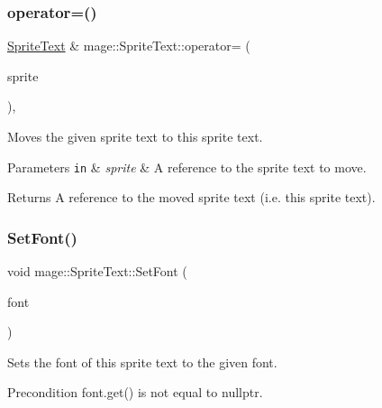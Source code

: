 \subsubsection{\texorpdfstring{operator=()}{operator=()}\hspace{0.1cm}{\footnotesize\ttfamily [2/2]}}
{\footnotesize\ttfamily \hyperlink{classmage_1_1_sprite_text}{Sprite\+Text} \& mage\+::\+Sprite\+Text\+::operator= (\begin{DoxyParamCaption}\item[{\hyperlink{classmage_1_1_sprite_text}{Sprite\+Text} \&\&}]{sprite }\end{DoxyParamCaption})\hspace{0.3cm}{\ttfamily [default]}, {\ttfamily [noexcept]}}

Moves the given sprite text to this sprite text.


\begin{DoxyParams}[1]{Parameters}
\mbox{\tt in}  & {\em sprite} & A reference to the sprite text to move. \\
\hline
\end{DoxyParams}
\begin{DoxyReturn}{Returns}
A reference to the moved sprite text (i.\+e. this sprite text). 
\end{DoxyReturn}
\hypertarget{classmage_1_1_sprite_text_a46235c90d3fc9872c2342cd17eaa9e89}{}\label{classmage_1_1_sprite_text_a46235c90d3fc9872c2342cd17eaa9e89} 
\subsubsection{\texorpdfstring{Set\+Font()}{SetFont()}}
{\footnotesize\ttfamily void mage\+::\+Sprite\+Text\+::\+Set\+Font (\begin{DoxyParamCaption}\item[{\hyperlink{namespacemage_a1e01ae66713838a7a67d30e44c67703e}{Shared\+Ptr}$<$ const \hyperlink{classmage_1_1_sprite_font}{Sprite\+Font} $>$}]{font }\end{DoxyParamCaption})\hspace{0.3cm}{\ttfamily [noexcept]}}

Sets the font of this sprite text to the given font.

\begin{DoxyPrecond}{Precondition}
{\ttfamily font.\+get()} is not equal to {\ttfamily nullptr}. 
\end{DoxyPrecond}

